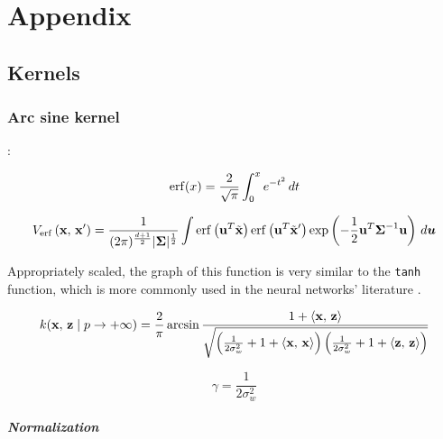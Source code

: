 \chapter{Appendix}
\section{Kernels}
\subsection{Arc sine kernel}

\textcite{frenayParameterinsensitiveKernelExtreme2011,williamsComputationInfiniteNeural1998}:


\begin{equation}
    \operatorname{erf}(x) = \frac{2}{\sqrt{\pi}} \int_0^x e^{-t^2} \,dt
\end{equation}


\begin{equation}
    V_{\operatorname{erf}}\left(\mathbf{x},\,\mathbf{x}'\right) =
    \frac{1}{(2\pi)^{\frac{d+1}{2}} |\boldsymbol \Sigma|^{\frac{1}{2}}}
    \int
        \operatorname{erf} \left(\mathbf{u} ^T \tilde {\mathbf{x}} \right)
        \operatorname{erf} \left(\mathbf{u} ^T \tilde {\mathbf{x}} '\right)
        \exp \left(
            -\frac{1}{2} \mathbf{u} ^T \boldsymbol \Sigma^{-1} \mathbf{u}
        \right)
    \,d\boldsymbol u
\end{equation}

Appropriately scaled, the graph of this function is very similar to the \texttt{tanh} function,
which is more commonly used in the neural networks' literature
\cite{williamsComputationInfiniteNeural1998}.

\begin{equation}
	k(\mathbf{x},\,\mathbf{z} \mid p \to + \infty)  = \frac{2}{\pi}
	\arcsin \frac{1 + \left\langle \mathbf{x},\,\mathbf{z} \right\rangle}{\sqrt{
			\left(
			\frac{1}{2\sigma_w^2} + 1 + \left\langle \mathbf{x},\,\mathbf{x} \right\rangle
			\right)
			\left(
			\frac{1}{2\sigma_w^2} + 1 + \left\langle \mathbf{z},\,\mathbf{z} \right\rangle
			\right)
		}}
\end{equation}

\begin{equation}
	\gamma = \frac{1}{2\sigma_w^2}
\end{equation}

\paragraph{Normalization}

